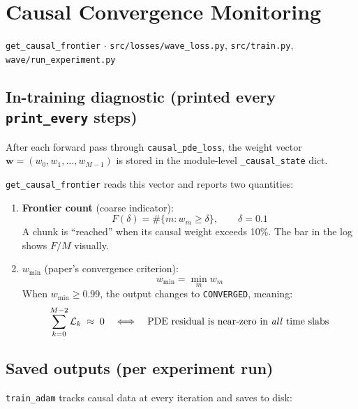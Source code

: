 \documentclass[11pt, a4paper]{article}
\newcommand{\fn}[1]{\texttt{\color{codeblue}#1}}
\newcommand{\file}[1]{\texttt{#1}}
\begin{document}
\section{Causal Convergence Monitoring}
\fn{get\_causal\_frontier} $\cdot$ \file{src/losses/wave\_loss.py},
\file{src/train.py}, \file{wave/run\_experiment.py}

\subsection{In-training diagnostic (printed every \texttt{print\_every} steps)}

After each forward pass through \fn{causal\_pde\_loss}, the weight vector
$\mathbf{w} = (w_0, w_1, \ldots, w_{M-1})$ is stored in the module-level
\texttt{\_causal\_state} dict.

\fn{get\_causal\_frontier} reads this vector and reports two quantities:

\begin{enumerate}
  \item \textbf{Frontier count} (coarse indicator):
  \begin{equation}
    F(\delta) = \#\{m : w_m \geq \delta\}, \qquad \delta = 0.1
  \end{equation}
  A chunk is ``reached'' when its causal weight exceeds 10\%.
  The bar in the log shows $F/M$ visually.

  \item \textbf{$w_{\min}$} (paper's convergence criterion):
  \begin{equation}
    w_{\min} = \min_{m} w_m
  \end{equation}
  When $w_{\min} \geq 0.99$, the output changes to \texttt{CONVERGED},
  meaning:
  \begin{equation}
    \sum_{k=0}^{M-2} \mathcal{L}_k \;\approx\; 0
    \quad \Longleftrightarrow \quad
    \text{PDE residual is near-zero in \emph{all} time slabs}
  \end{equation}
\end{enumerate}

\subsection{Saved outputs (per experiment run)}

\fn{train\_adam} tracks causal data at every iteration and saves to disk:
\end{document}
